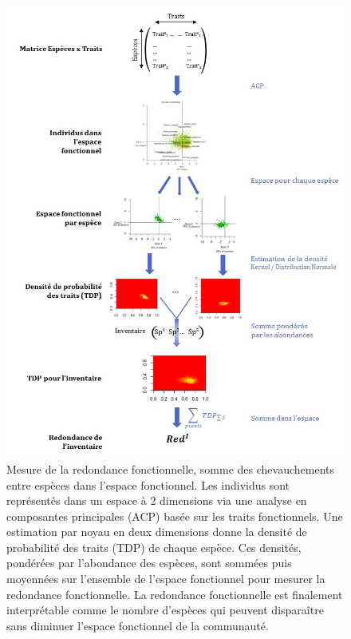 \documentclass[
  11pt,
  french,
  A4paper,
  extrafontsizes,onecolumn,openright
  ]{memoir}
\begin{document}
\begin{figure}

{\centering \includegraphics[width=1\linewidth]{ExternalFig/Fig_MesureRedondance} 

}

\caption{Mesure de la redondance fonctionnelle, somme des chevauchements entre espèces dans l'espace fonctionnel. Les individus sont représentés dans un espace à 2 dimensions via une analyse en composantes principales (ACP) basée sur les traits fonctionnels. Une estimation par noyau en deux dimensions donne la densité de probabilité des traits (TDP) de chaque espèce. Ces densités, pondérées par l'abondance des espèces, sont sommées puis moyennées sur l'ensemble de l'espace fonctionnel pour mesurer la redondance fonctionnelle. La redondance fonctionnelle est finalement interprétable comme le nombre d'espèces qui peuvent disparaître sans diminuer l'espace fonctionnel de la communauté.}\label{fig:RedundancyMethod}
\end{figure}
\end{document}
